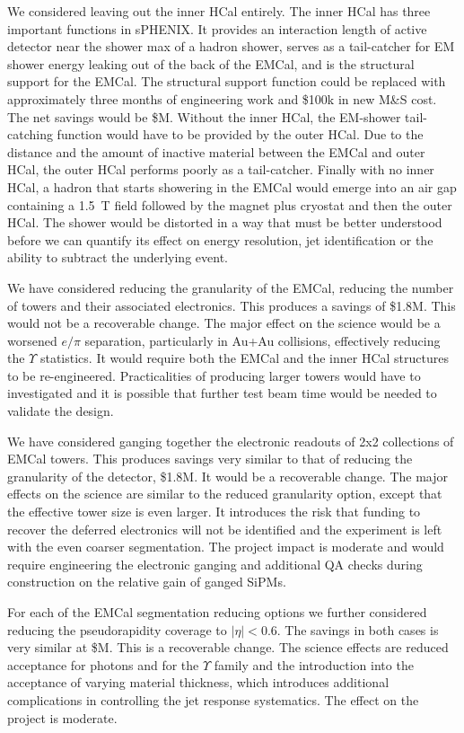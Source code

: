 We considered leaving out the inner HCal entirely.  The inner HCal has
three important functions in sPHENIX.  It provides an interaction
length of active detector near the shower max of a hadron shower,
serves as a tail-catcher for EM shower energy leaking out of the back
of the EMCal, and is the structural support for the EMCal.  The
structural support function could be replaced with approximately three
months of engineering work and \$100k in new M\&S cost.  The net
savings would be \${\noInnerHCal}M.  Without the inner HCal, the
EM-shower tail-catching function would have to be provided by the
outer HCal.  Due to the distance and the amount of inactive material
between the EMCal and outer HCal, the outer HCal performs poorly as a
tail-catcher.  Finally with no inner HCal, a hadron that starts
showering in the EMCal would emerge into an air gap containing a 1.5~T
field followed by the magnet plus cryostat and then the outer HCal.
The shower would be distorted in a way that must be better understood
before we can quantify its effect on energy resolution, jet
identification or the ability to subtract the underlying event.

We have considered reducing the granularity of the EMCal, reducing the
number of towers and their associated electronics.  This produces a
savings of \$1.8M.  This would not be a recoverable change.  The major
effect on the science would be a worsened $e/\pi$ separation,
particularly in Au+Au collisions, effectively reducing the $\Upsilon$
statistics.  It would require both the EMCal and the inner HCal
structures to be re-engineered.  Practicalities of producing larger
towers would have to investigated and it is possible that further test
beam time would be needed to validate the design.

We have considered ganging together the electronic readouts of 2x2
collections of EMCal towers. This produces savings very similar to
that of reducing the granularity of the detector, \$1.8M.  It would be
a recoverable change.  The major effects on the science are similar to
the reduced granularity option, except that the effective tower size
is even larger.  It introduces the risk that funding to recover the
deferred electronics will not be identified and the experiment is left
with the even coarser segmentation.  The project impact is moderate
and would require engineering the electronic ganging and additional QA
checks during construction on the relative gain of ganged SiPMs.

For each of the EMCal segmentation reducing options we further
considered reducing the pseudorapidity coverage to $|\eta| < 0.6$.
The savings in both cases is very similar at \${\reducedEMCaleta}M.
This is a recoverable change.  The science effects are reduced
acceptance for photons and for the $\Upsilon$ family and the
introduction into the acceptance of varying material thickness, which
introduces additional complications in controlling the jet response
systematics. The effect on the project is moderate.

